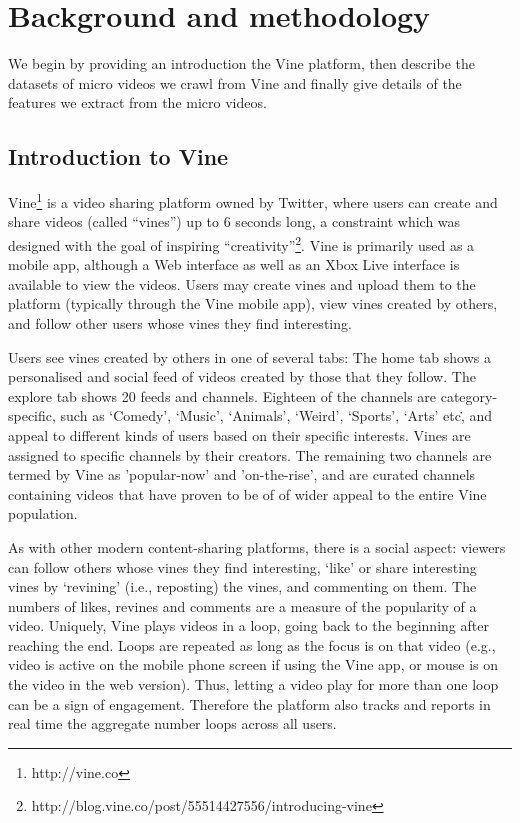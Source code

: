 \section{Background and methodology}
We begin by providing an introduction the Vine platform, then describe the datasets of micro videos we crawl from Vine and finally give details of the features we extract from the micro videos.
\subsection{Introduction to Vine}

Vine\footnote{http://vine.co} is a video sharing platform owned by Twitter, where users can create and share videos (called ``vines'') up to 6 seconds long, a constraint which was designed with the goal of inspiring ``creativity''\footnote{http://blog.vine.co/post/55514427556/introducing-vine}. Vine is primarily used as a mobile app, although a Web interface as well as an Xbox Live interface is available to view the videos. Users may create vines and upload them to the platform (typically through the Vine mobile app), view vines created by others, and follow other users whose vines they find interesting. 

Users see vines created by others in one of several tabs: The home tab shows a personalised and social feed of videos created by those that they follow. The explore tab shows 20 feeds and channels. Eighteen of the channels are category-specific, such as `Comedy', `Music', `Animals', `Weird', `Sports', `Arts' etc\., and appeal to different kinds of users based on their specific interests. Vines are  assigned to specific channels by their creators. The remaining two channels are termed by Vine as 'popular-now' and 'on-the-rise',  and are curated channels containing videos that have proven to be of of wider appeal to the entire Vine population. 

As with other modern content-sharing platforms, there is a social aspect: viewers can follow others whose vines they find interesting, `like' or share interesting vines by `revining' (i.e., reposting) the vines, and commenting on them. The numbers of likes, revines and comments are a measure of the popularity of a video. Uniquely, Vine plays videos in a loop, going back to the beginning after reaching the end. Loops are repeated as long as the focus is on that video (e.g., video is active on the mobile phone screen if using the Vine app, or mouse is on the video in the web version). Thus, letting a video play for more than one loop can be a sign of engagement. Therefore the platform also tracks and reports in real time the aggregate number loops across all users. 

